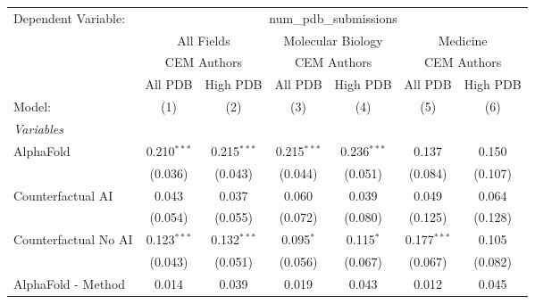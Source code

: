 \begingroup
\centering
\begin{tabular}{lcccccc}
   \tabularnewline \midrule \midrule
   Dependent Variable: & \multicolumn{6}{c}{num\_pdb\_submissions}\\
 & \multicolumn{2}{c}{All Fields} & \multicolumn{2}{c}{Molecular Biology} & \multicolumn{2}{c}{Medicine} \\
\cmidrule(lr){2-3} \cmidrule(lr){4-5} \cmidrule(lr){6-7}
 & \multicolumn{2}{c}{CEM Authors} & \multicolumn{2}{c}{CEM Authors} & \multicolumn{2}{c}{CEM Authors} \\
\cmidrule(lr){2-3} \cmidrule(lr){4-5} \cmidrule(lr){6-7}
 & \multicolumn{1}{c}{All PDB} & \multicolumn{1}{c}{High PDB} & \multicolumn{1}{c}{All PDB} & \multicolumn{1}{c}{High PDB} & \multicolumn{1}{c}{All PDB} & \multicolumn{1}{c}{High PDB} \\
\cmidrule(lr){2-2} \cmidrule(lr){3-3} \cmidrule(lr){4-4} \cmidrule(lr){5-5} \cmidrule(lr){6-6} \cmidrule(lr){7-7}
   Model:                                                     & (1)           & (2)           & (3)           & (4)           & (5)           & (6)\\  
   \midrule
   \emph{Variables}\\
   AlphaFold                                                  & 0.210$^{***}$ & 0.215$^{***}$ & 0.215$^{***}$ & 0.236$^{***}$ & 0.137         & 0.150\\   
                                                              & (0.036)       & (0.043)       & (0.044)       & (0.051)       & (0.084)       & (0.107)\\   
   Counterfactual AI                                          & 0.043         & 0.037         & 0.060         & 0.039         & 0.049         & 0.064\\   
                                                              & (0.054)       & (0.055)       & (0.072)       & (0.080)       & (0.125)       & (0.128)\\   
   Counterfactual No AI                                       & 0.123$^{***}$ & 0.132$^{***}$ & 0.095$^{*}$   & 0.115$^{*}$   & 0.177$^{***}$ & 0.105\\   
                                                              & (0.043)       & (0.051)       & (0.056)       & (0.067)       & (0.067)       & (0.082)\\   
   AlphaFold - Method                                         & 0.014         & 0.039         & 0.019         & 0.043         & 0.012         & 0.045\\   

\end{tabular}
